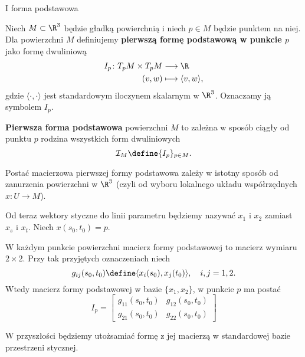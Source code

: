\begin{frame}[<+->]{I forma podstawowa}

\begin{definicja}
Niech $M\subset \R^3$ będzie gładką powierchnią i niech $p\in M$ będzie punktem na niej. Dla powierzchni $M$ definiujemy \textbf{pierwszą formę podstawową w punkcie $p$} jako formę dwuliniową
\begin{align*}
I_p\colon T_pM\times T_pM &\longrightarrow \R\\
(v,w)&\longmapsto\langle v,w\rangle,
\end{align*}
gdzie $\langle\cdot,\cdot\rangle$ jest standardowym iloczynem skalarnym w $\R^3$. Oznaczamy ją symbolem $I_p.$
\end{definicja}

\end{frame}
\begin{frame}

\begin{definicja}
\textbf{Pierwsza forma podstawowa} powierzchni $M$ to zależna w sposób ciągły od punktu $p$ rodzina wszystkich form dwuliniowych \[\mathcal{I}_M\define\{I_p\}_{p\in M}.\]
\end{definicja}
\pause
\begin{uwaga}
Postać macierzowa pierwszej formy podstawowa zależy w istotny sposób od zanurzenia powierzchni w $\R^3$ (czyli od wyboru lokalnego układu współrzędnych $x\colon U\to M$). 
\end{uwaga}

\pause Od teraz wektory styczne do linii parametru będziemy nazywać $x_1$ i $x_2$ zamiast $x_s$ i $x_t$. Niech $x(s_0,t_0)=p$.

\end{frame}
\begin{frame}
\begin{uwaga}
W każdym punkcie powierzchni macierz formy podstawowej to macierz wymiaru $2\times 2$. 
\pause Przy tak przyjętych oznaczeniach niech
\[g_{ij}(s_0,t_0)\define\langle x_i(s_0),x_j(t_0)\rangle,\quad i,j = 1,2.\]
Wtedy macierz formy podstawowej w bazie $\{x_1,x_2\}$, w punkcie $p$ ma postać
\[I_p=\left[
\begin{array}{cc}
g_{11}(s_0,t_0) & g_{12}(s_0,t_0)\\
g_{21}(s_0,t_0) & g_{22}(s_0,t_0)
\end{array}
\right]
\]
\end{uwaga}

\pause W przyszłości będziemy utożsamiać formę z jej macierzą w standardowej bazie przestrzeni stycznej.


\end{frame}
